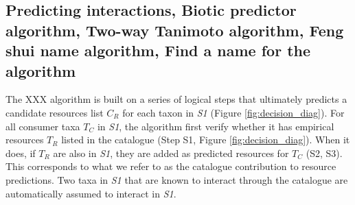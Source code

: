 \documentclass[letterpaper]{article}
\begin{document}
  \subsection{Predicting interactions, Biotic predictor algorithm, Two-way Tanimoto algorithm, Feng shui name algorithm, Find a name for the algorithm}


The XXX algorithm is built on a series of logical steps that ultimately predicts a candidate resources list $C_R$ for each taxon in \textit{S1} (Figure \ref{fig:decision_diag}). For all consumer taxa $T_C$ in \textit{S1}, the algorithm first verify whether it has empirical resources $T_R$ listed in the catalogue (Step S1, Figure \ref{fig:decision_diag}). When it does, if $T_R$ are also in \textit{S1}, they are added as predicted resources for $T_C$ (S2, S3). This corresponds to what we refer to as the catalogue contribution to resource predictions. Two taxa in \textit{S1} that are known to interact through the catalogue are automatically assumed to interact in \textit{S1}.
\end{document}

